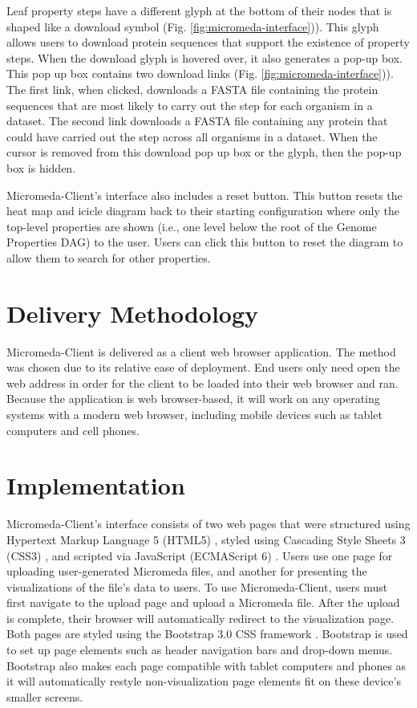 Leaf property steps have a different glyph at the bottom of their nodes that is shaped like a download symbol (Fig. \ref{fig:micromeda-interface})). This glyph allows users to download protein sequences that support the existence of property steps. When the download glyph is hovered over, it also generates a pop-up box. This pop up box contains two download links (Fig. \ref{fig:micromeda-interface})). The first link, when clicked, downloads a FASTA file containing the protein sequences that are most likely to carry out the step for each organism in a dataset. The second link downloads a FASTA file containing any protein that could have carried out the step across all organisms in a dataset. When the cursor is removed from this download pop up box or the glyph, then the pop-up box is hidden.

Micromeda-Client's interface also includes a reset button. This button resets the heat map and icicle diagram back to their starting configuration where only the top-level properties are shown (i.e., one level below the root of the Genome Properties DAG) to the user. Users can click this button to reset the diagram to allow them to search for other properties.

\section{Delivery Methodology} \label{client-delivery-method}

Micromeda-Client is delivered as a client web browser application. The method was chosen due to its relative ease of deployment. End users only need open the web address in order for the client to be loaded into their web browser and ran. Because the application is web browser-based, it will work on any operating systems with a modern web browser, including mobile devices such as tablet computers and cell phones.

\section{Implementation} \label{client-implementation}

Micromeda-Client's interface consists of two web pages that were structured using Hypertext Markup Language 5 (HTML5) \cite{HTML5}, styled using Cascading Style Sheets 3 (CSS3) \cite{CSS3}, and scripted via JavaScript (ECMAScript 6) \cite{flanagan2006javascript}. Users use one page for uploading user-generated Micromeda files, and another for presenting the visualizations of the file's data to users. To use Micromeda-Client, users must first navigate to the upload page and upload a Micromeda file. After the upload is complete, their browser will automatically redirect to the visualization page. Both pages are styled using the Bootstrap 3.0 CSS framework \cite{spurlock2013bootstrap}. Bootstrap is used to set up page elements such as header navigation bars and drop-down menus. Bootstrap also makes each page compatible with tablet computers and phones as it will automatically restyle non-visualization page elements fit on these device's smaller screens.

